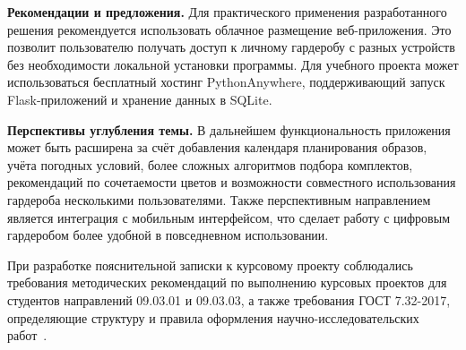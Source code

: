 \textbf{Рекомендации и предложения.} Для практического применения разработанного решения рекомендуется использовать облачное размещение веб-приложения. Это позволит пользователю получать доступ к личному гардеробу с разных устройств без необходимости локальной установки программы. Для учебного проекта может использоваться бесплатный хостинг PythonAnywhere, поддерживающий запуск Flask-приложений и хранение данных в SQLite.

\textbf{Перспективы углубления темы.} В дальнейшем функциональность приложения может быть расширена за счёт добавления календаря планирования образов, учёта погодных условий, более сложных алгоритмов подбора комплектов, рекомендаций по сочетаемости цветов и возможности совместного использования гардероба несколькими пользователями. Также перспективным направлением является интеграция с мобильным интерфейсом, что сделает работу с цифровым гардеробом более удобной в повседневном использовании.

При разработке пояснительной записки к курсовому проекту соблюдались требования методических рекомендаций по выполнению курсовых проектов для студентов направлений 09.03.01 и 09.03.03, а также требования ГОСТ 7.32-2017, определяющие структуру и правила оформления научно-исследовательских работ~\cite{method_course_project,gost_report}.